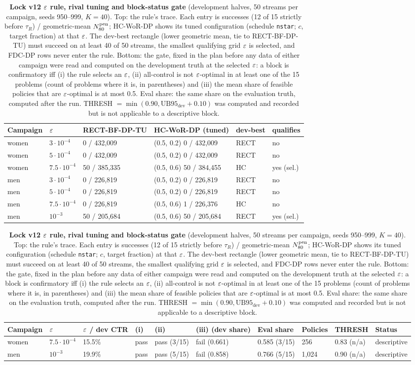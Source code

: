 \begin{table}[t]
\caption{\textbf{Lock v12 $\varepsilon$ rule, rival tuning and block-status gate} (development halves, 50 streams per campaign, seeds 950--999, $K = 40$). Top: the rule's trace. Each entry is successes (12 of 15 strictly before $\tau_R$) / geometric-mean $N_{80}^{\text{pen}}$; HC-WoR-DP shows its tuned configuration (schedule \texttt{nstar}; $c$, target fraction) at that $\varepsilon$. The dev-best rectangle (lower geometric mean, tie to RECT-BF-DP-TU) must succeed on at least 40 of 50 streams, the smallest qualifying grid $\varepsilon$ is selected, and FDC-DP rows never enter the rule. Bottom: the gate, fixed in the plan before any data of either campaign were read and computed on the development truth at the selected $\varepsilon$: a block is confirmatory iff (i) the rule selects an $\varepsilon$, (ii) all-control is not $\varepsilon$-optimal in at least one of the 15 problems (count of problems where it is, in parentheses) and (iii) the mean share of feasible policies that are $\varepsilon$-optimal is at most 0.5. Eval share: the same share on the evaluation truth, computed after the run. THRESH $= \min(0.90, \mathrm{UB95}_{\text{dev}} + 0.10)$ was computed and recorded but is not applicable to a descriptive block.}
\label{tab:v12gate}
\small
\setlength{\tabcolsep}{3.5pt}
\begin{tabular}{@{}llllll@{}}
\toprule
Campaign & $\varepsilon$ & RECT-BF-DP-TU & HC-WoR-DP (tuned) & dev-best & qualifies \\
\midrule
women & $3\cdot 10^{-4}$ & 0 / 432,009 & (0.5, 0.2) 0 / 432,009 & RECT & no \\
women & $5\cdot 10^{-4}$ & 0 / 432,009 & (0.5, 0.2) 0 / 432,009 & RECT & no \\
women & $7.5\cdot 10^{-4}$ & 50 / 385,335 & (0.5, 0.6) 50 / 384,455 & HC & yes (sel.) \\
men & $3\cdot 10^{-4}$ & 0 / 226,819 & (0.5, 0.2) 0 / 226,819 & RECT & no \\
men & $5\cdot 10^{-4}$ & 0 / 226,819 & (0.5, 0.2) 0 / 226,819 & RECT & no \\
men & $7.5\cdot 10^{-4}$ & 0 / 226,819 & (0.5, 0.6) 1 / 226,376 & HC & no \\
men & $10^{-3}$ & 50 / 205,684 & (0.5, 0.6) 50 / 205,684 & RECT & yes (sel.) \\
\bottomrule
\end{tabular}

\medskip
\begin{tabular}{@{}llllllllll@{}}
\toprule
Campaign & $\varepsilon$ & $\varepsilon$ / dev CTR & (i) & (ii) & (iii) (dev share) & Eval share & Policies & THRESH & Status \\
\midrule
women & $7.5\cdot 10^{-4}$ & 15.5\% & pass & pass (3/15) & fail (0.661) & 0.585 (3/15) & 256 & 0.83 (n/a) & descriptive \\
men & $10^{-3}$ & 19.9\% & pass & pass (5/15) & fail (0.858) & 0.766 (5/15) & 1,024 & 0.90 (n/a) & descriptive \\
\bottomrule
\end{tabular}
\end{table}
